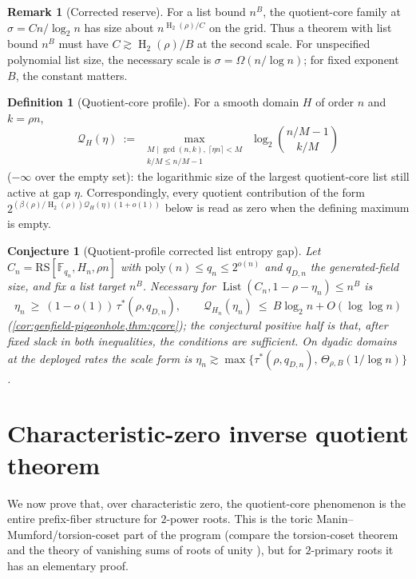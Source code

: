 \documentclass[11pt]{article}
\newtheorem{conjecture}[conjecture]{Conjecture}
\theoremstyle{definition}
\newtheorem{definition}[definition]{Definition}
\newtheorem{remark}[remark]{Remark}
\newcommand{\F}{\mathbb F}
\newcommand{\HH}{\operatorname{H}_2}
\newcommand{\RS}{\mathrm{RS}}
\newcommand{\Lst}{\operatorname{List}}
\newcommand{\taustar}{\tau^{*}}
\begin{document}
\begin{remark}[Corrected reserve]\label{rem:corrected-reserve}
For a list bound $n^B$, the quotient-core family at $\sigma=Cn/\log_2n$ has size about $n^{\HH(\rho)/C}$ on the grid.  Thus a theorem with list bound $n^B$ must have $C\gtrsim \HH(\rho)/B$ at the second scale.  For unspecified polynomial list size, the necessary scale is $\sigma=\Omega(n/\log n)$; for fixed exponent $B$, the constant matters.
\end{remark}

\begin{definition}[Quotient-core profile]\label{def:qprofile}
For a smooth domain $H$ of order $n$ and $k=\rho n$,
\[
        \mathcal Q_H(\eta)\ :=\ \max_{\substack{M\mid\gcd(n,k),\ \lceil\eta n\rceil<M\\ k/M\le n/M-1}}\ \log_2\binom{n/M-1}{k/M}
\]
($-\infty$ over the empty set): the logarithmic size of the largest quotient-core list still active at gap $\eta$.  Correspondingly, every quotient contribution of the form $2^{(\beta(\rho)/\HH(\rho))\mathcal Q_H(\eta)(1+o(1))}$ below is read as zero when the defining maximum is empty.
\end{definition}

\begin{conjecture}[Quotient-profile corrected list entropy gap]\label{conj:listprofile}
Let $C_n=\RS[\F_{q_n},H_n,\rho n]$ with $\mathrm{poly}(n)\le q_n\le2^{o(n)}$ and $q_{D,n}$ the generated-field size, and fix a list target $n^B$.  Necessary for $\Lst(C_n,1-\rho-\eta_n)\le n^B$ is
\[
        \eta_n\ \ge\ (1-o(1))\,\taustar(\rho,q_{D,n}),
        \qquad
        \mathcal Q_{H_n}(\eta_n)\ \le\ B\log_2n+O(\log\log n)
\]
(\cref{cor:genfield-pigeonhole,thm:qcore}); the conjectural positive half is that, after fixed slack in both inequalities, the conditions are sufficient.  On dyadic domains at the deployed rates the scale form is $\eta_n\gtrsim\max\{\taustar(\rho,q_{D,n}),\,\Theta_{\rho,B}(1/\log n)\}$.
\end{conjecture}

\section{Characteristic-zero inverse quotient theorem}\label{sec:upstairs}

We now prove that, over characteristic zero, the quotient-core phenomenon is the entire prefix-fiber structure for $2$-power roots.  This is the toric Manin--Mumford/torsion-coset part of the program (compare the torsion-coset theorem \cite{Laurent84} and the theory of vanishing sums of roots of unity \cite{CJ76,LL00}), but for $2$-primary roots it has an elementary proof.
\end{document}
